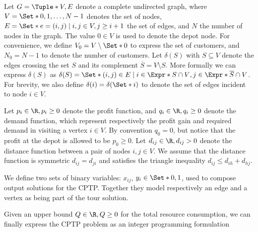 Let $G = \Tuple*{V, E}$ denote a complete undirected graph, where $V = \Set*{0, 1, \dots, N - 1}$ denotes the set of nodes,
$E = \Set*{e = (i, j) \mid i,j \in V, j \ge i + 1}$ the set of edges, and $N$ the number of nodes in the graph.
The value $0 \in V$ is used to denote the depot node.
For convenience, we define $V_0 = V \setminus \Set*{0}$ to express the set of customers, and $N_0 = N - 1$ to denote the number of customers.
Let $\delta(S)$ with $S \subseteq V$ denote the edges crossing the set $S$ and its complement $\overline{S} = V \setminus S$.
More formally we can express $\delta(S)$ as $\delta(S) = \Set*{ (i, j) \in E \mid i \in \Expr*{S \cap V}, j \in \Expr*{ \overline{S} \cap V } }$.
For brevity, we also define $\delta(i) = \delta(\Set*{i})$ to denote the set of edges incident to node $i \in V$.

Let $p_{i} \in \R, p_{i} \ge 0$ denote the profit function, and $q_{i} \in \R, q_{i} \ge 0$ denote the demand function, which represent respectively the profit gain and required demand in visiting a vertex $i \in V$.
By convention $q_0 = 0$, but notice that the profit at the depot is allowed to be $p_0 \ge 0$.
Let $d_{ij} \in \R, d_{ij} > 0$ denote the distance function between a pair of nodes  $i, j \in V$.
We assume that the distance function is symmetric $d_{ij} = d_{ji}$ and satisfies the triangle inequality $d_{ij} \le d_{ih} + d_{hj}$.

We define two sets of binary variables: $x_{ij}$, $y_{i} \in \Set*{0, 1}$, used to compose output solutions for the CPTP.
Together they model respectively an edge and a vertex as being part of the tour solution.

Given an upper bound $Q \in \R,Q \ge 0$ for the total resource consumption, we can finally express the CPTP problem as an integer programming formulation

